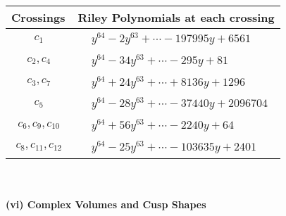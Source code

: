 \documentclass[1p]{elsarticle_modified}
\theoremstyle{definition}
\begin{document}
\begin{tabular}{m{50pt}|m{274pt}}
Crossings & \hspace{64pt}Riley Polynomials at each crossing \\
\hline $$\begin{aligned}c_{1}\end{aligned}$$&$\begin{aligned}
&y^{64}-2 y^{63}+\cdots-197995 y+6561
\end{aligned}$\\
\hline $$\begin{aligned}c_{2},c_{4}\end{aligned}$$&$\begin{aligned}
&y^{64}-34 y^{63}+\cdots-295 y+81
\end{aligned}$\\
\hline $$\begin{aligned}c_{3},c_{7}\end{aligned}$$&$\begin{aligned}
&y^{64}+24 y^{63}+\cdots+8136 y+1296
\end{aligned}$\\
\hline $$\begin{aligned}c_{5}\end{aligned}$$&$\begin{aligned}
&y^{64}-28 y^{63}+\cdots-37440 y+2096704
\end{aligned}$\\
\hline $$\begin{aligned}c_{6},c_{9},c_{10}\end{aligned}$$&$\begin{aligned}
&y^{64}+56 y^{63}+\cdots-2240 y+64
\end{aligned}$\\
\hline $$\begin{aligned}c_{8},c_{11},c_{12}\end{aligned}$$&$\begin{aligned}
&y^{64}-25 y^{63}+\cdots-103635 y+2401
\end{aligned}$\\
\hline
\end{tabular}\\~\\
\newpage\flushleft \textbf{(vi) Complex Volumes and Cusp Shapes}
\end{document}
